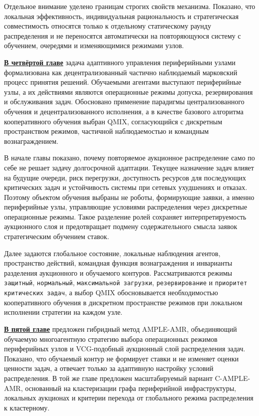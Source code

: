 Отдельное внимание уделено границам строгих свойств механизма. Показано, что
локальная эффективность, индивидуальная рациональность и стратегическая
совместимость относятся только к отдельному статическому раунду распределения
и не переносятся автоматически на повторяющуюся систему с обучением,
очередями и изменяющимися режимами узлов.

\underline{\textbf{В четвёртой главе}} задача адаптивного управления
периферийными узлами формализована как децентрализованный частично
наблюдаемый марковский процесс принятия решений. Обучаемыми агентами
выступают периферийные узлы, а их действиями являются операционные режимы
допуска, резервирования и обслуживания задач. Обосновано применение
парадигмы централизованного обучения и децентрализованного исполнения, а в
качестве базового алгоритма кооперативного обучения выбран QMIX, согласующийся
с дискретным пространством режимов, частичной наблюдаемостью и командным
вознаграждением.

В начале главы показано, почему повторяемое аукционное распределение само по
себе не решает задачу долгосрочной адаптации. Текущее назначение задач влияет
на будущие очереди, риск перегрузки, доступность ресурсов для последующих
критических задач и устойчивость системы при сетевых ухудшениях и отказах.
Поэтому объектом обучения выбраны не роботы, формирующие заявки, а именно
периферийные узлы, управляющие условиями распределения через дискретные
операционные режимы. Такое разделение ролей сохраняет интерпретируемость
аукционного слоя и предотвращает подмену содержательного смысла заявок
стратегическим обучением ставок.

Далее задаются глобальное состояние, локальные наблюдения агентов, пространство
действий, командная функция вознаграждения и инварианты разделения аукционного
и обучаемого контуров. Рассматриваются режимы \texttt{защитный},
\texttt{нормальный}, \texttt{максимальной загрузки}, \texttt{резервирование} и
\texttt{приоритет критических задач}, а выбор QMIX обосновывается необходимостью кооперативного
обучения в дискретном пространстве режимов при локальном исполнении стратегии
на каждом узле.

\underline{\textbf{В пятой главе}} предложен гибридный метод AMPLE-AMR,
объединяющий обучаемую многоагентную стратегию выбора операционных режимов
периферийных узлов и VCG-подобный аукционный слой распределения задач.
Показано, что обучаемый контур не формирует ставки и не изменяет оценки
ценности задач, а отвечает только за адаптивную настройку условий
распределения. В той же главе предложен масштабируемый вариант C-AMPLE-AMR,
основанный на кластеризации графа периферийной инфраструктуры, локальных
аукционах и критерии перехода от глобального режима распределения к
кластерному.

